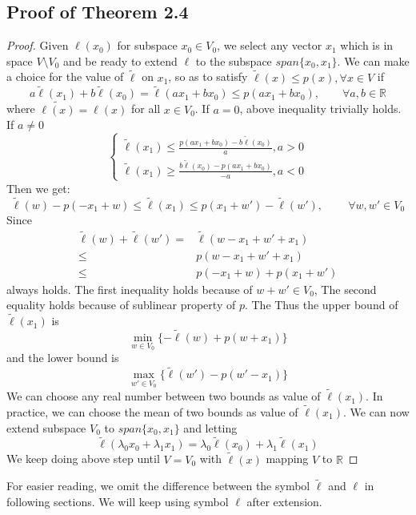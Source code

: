 \documentclass{article}
\begin{document}
\subsection{Proof of Theorem 2.4}
\label{subsec:proof HB}
\begin{proof}
	Given $\ell(x_0)$ for subspace $x_0\in V_0$, we select any vector $x_1$ which is in space $V\setminus V_0$ and
	be ready to extend $\ell$ to the subspace $span\{x_0,x_1\}$. We can make a choice for the value of $\tilde{\ell}$ on $x_1$, so as to satisfy
	$\tilde{\ell}(x)\le p(x), \forall x\in V$ if
	\begin{equation*}
		a\tilde{\ell}(x_1)+b\tilde{\ell}(x_0)=\tilde{\ell}(ax_1+bx_0)\le p(ax_1+bx_0),\qquad \forall a,b\in\mathbb{R}
	\end{equation*}
where $\tilde{\ell(x)}=\ell(x)$ for all $x\in V_0$.	If $a=0$, above inequality trivially holds. If $a\neq 0$
	\[
		\left\{
		\begin{array}{ll}
			\tilde{\ell}(x_1)\leq \frac{p(ax_1+bx_0)-b\tilde{\ell}(x_0)}{a},a>0 \\
			\tilde{\ell}(x_1)\geq \frac{b\tilde{\ell}(x_0)-p(ax_1+bx_0)}{-a},a<0
		\end{array}
		\right.
	\]
	Then we get:
	\begin{equation*}
		\tilde{\ell}(w)-p(-x_1+w)\leq\tilde{\ell}(x_1)\leq p(x_1+w')-\tilde{\ell}(w'),\qquad ~\forall w, w'\in V_0
	\end{equation*}
	Since
	\begin{align*}
		\tilde{\ell}(w)+\tilde{\ell}(w')= &\tilde{\ell}(w-x_1+w'+x_1)  \\
		\leq              & p(w-x_1+w'+x_1)     \\
		\leq              & p(-x_1+w)+p(x_1+w')
	\end{align*}
	always holds. The first inequality holds because of $w+w'\in V_0$, The second equality holds because of sublinear property of $p$. The Thus the 
	upper bound of $\tilde{\ell}(x_1)$ is
	\begin{equation}\label{l upper bound}
		\min_{w\in V_0}{\{-\tilde{\ell}(w)+p(w+x_1)}\}
	\end{equation}
	and the lower bound is
	\begin{equation}\label{l lower bound}
		\max_{w'\in V_0}{\{\tilde{\ell}(w')-p(w'-x_1)}\}
	\end{equation}
	We can choose any real number between two bounds as value of $\tilde{\ell}(x_1)$. In practice, we can choose the mean of two bounds as value of $\tilde{\ell}(x_1)$.
	We can now extend subspace $V_0$ to $span\{x_0,x_1\}$ and letting
	\begin{equation*}
		\tilde{\ell}(\lambda_0x_0+\lambda_1x_1)=\lambda_0\tilde{\ell}(x_0)+\lambda_1\tilde{\ell}(x_1)
	\end{equation*}
	We keep doing above step until $V=V_0$ with $\tilde{\ell}(x)$ mapping $V$ to $\mathbb{R}$
\end{proof}
For easier reading, we omit the difference between the symbol $\tilde{\ell}$ and $\ell$ in following sections. We will keep using symbol $\ell$ after extension.
\end{document}
